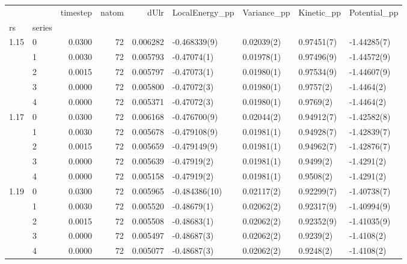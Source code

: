 \begin{tabular}{llrrrllll}
\toprule
     &   &  timestep &  natom &      dUlr &  LocalEnergy\_pp &     Variance\_pp &      Kinetic\_pp &   Potential\_pp \\
rs & series &           &        &           &                 &                 &                 &                \\
\midrule
1.15 & 0 &    0.0300 &     72 &  0.006282 &    -0.468339(9) &      0.02039(2) &      0.97451(7) &    -1.44285(7) \\
     & 1 &    0.0030 &     72 &  0.005793 &     -0.47074(1) &      0.01978(1) &      0.97496(9) &    -1.44572(9) \\
     & 2 &    0.0015 &     72 &  0.005797 &     -0.47073(1) &      0.01980(1) &      0.97534(9) &    -1.44607(9) \\
     & 3 &    0.0000 &     72 &  0.005800 &     -0.47072(3) &      0.01980(1) &       0.9757(2) &     -1.4464(2) \\
     & 4 &    0.0000 &     72 &  0.005371 &     -0.47072(3) &      0.01980(1) &       0.9769(2) &     -1.4464(2) \\
1.17 & 0 &    0.0300 &     72 &  0.006168 &    -0.476700(9) &      0.02044(2) &      0.94912(7) &    -1.42582(8) \\
     & 1 &    0.0030 &     72 &  0.005678 &    -0.479108(9) &      0.01981(1) &      0.94928(7) &    -1.42839(7) \\
     & 2 &    0.0015 &     72 &  0.005659 &    -0.479149(9) &      0.01981(1) &      0.94962(7) &    -1.42876(7) \\
     & 3 &    0.0000 &     72 &  0.005639 &     -0.47919(2) &      0.01981(1) &       0.9499(2) &     -1.4291(2) \\
     & 4 &    0.0000 &     72 &  0.005158 &     -0.47919(2) &      0.01981(1) &       0.9508(2) &     -1.4291(2) \\
1.19 & 0 &    0.0300 &     72 &  0.005965 &   -0.484386(10) &      0.02117(2) &      0.92299(7) &    -1.40738(7) \\
     & 1 &    0.0030 &     72 &  0.005520 &     -0.48679(1) &      0.02062(2) &      0.92317(9) &    -1.40994(9) \\
     & 2 &    0.0015 &     72 &  0.005508 &     -0.48683(1) &      0.02062(2) &      0.92352(9) &    -1.41035(9) \\
     & 3 &    0.0000 &     72 &  0.005497 &     -0.48687(3) &      0.02062(2) &       0.9239(2) &     -1.4108(2) \\
     & 4 &    0.0000 &     72 &  0.005077 &     -0.48687(3) &      0.02062(2) &       0.9248(2) &     -1.4108(2) \\

\end{tabular}
